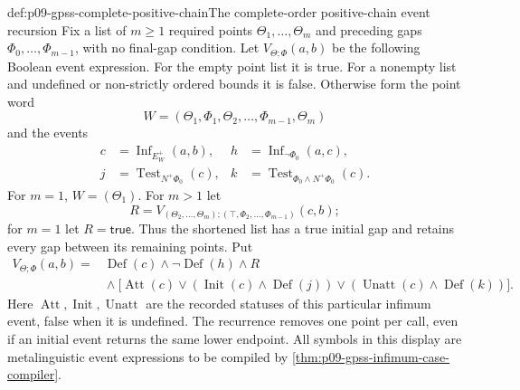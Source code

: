 \begin{hbdefinition}{def:p09-gpss-complete-positive-chain}{The complete-order positive-chain event recursion}
Fix a list of \(m\geq1\) required points
\(\Theta_1,\ldots,\Theta_m\) and preceding gaps
\(\Phi_0,\ldots,\Phi_{m-1}\), with no final-gap condition.
Let \(V_{\Theta;\Phi}(a,b)\) be the following Boolean event
expression. For the empty point list it is true. For a nonempty
list and undefined or non-strictly ordered bounds it is false.
Otherwise form the point word
\[
                     W=(\Theta_1,\Phi_1,\Theta_2,\ldots,
                                      \Phi_{m-1},\Theta_m)
\]
and the events
\[
\begin{aligned}
 c&=\operatorname{Inf}_{E^+_W}(a,b),&
 h&=\operatorname{Inf}_{\neg\Phi_0}(a,c),\\
 j&=\operatorname{Test}_{N^+\Phi_0}(c),&
 k&=\operatorname{Test}_{\Phi_0\land N^+\Phi_0}(c).
\end{aligned}
\]
For \(m=1\), \(W=(\Theta_1)\). For \(m>1\) let
\[
 R=V_{(\Theta_2,\ldots,\Theta_m);
                  (\top,\Phi_2,\ldots,\Phi_{m-1})}(c,b);
\]
for \(m=1\) let \(R=\mathsf{true}\). Thus the shortened
list has a true initial gap and retains every gap between
its remaining points. Put
\[
\begin{split}
 V_{\Theta;\Phi}(a,b)={}&
 \operatorname{Def}(c)\land\neg\operatorname{Def}(h)\land R\\
 &{}\land\bigl[
       \operatorname{Att}(c)
       \lor(\operatorname{Init}(c)\land\operatorname{Def}(j))
       \lor(\operatorname{Unatt}(c)\land\operatorname{Def}(k))
                    \bigr].
\end{split}
\]
Here \(\operatorname{Att},\operatorname{Init},\operatorname{Unatt}\)
are the recorded statuses of this particular infimum event, false
when it is undefined. The recurrence removes one point per call,
even if an initial event returns the same lower endpoint.
All symbols in this display are metalinguistic event expressions
to be compiled by \cref{thm:p09-gpss-infimum-case-compiler}.
\end{hbdefinition}


